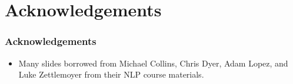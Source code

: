 
\section*{Acknowledgements}

\begin{frame}
\frametitle{Acknowledgements}
\begin{itemize}
\item Many slides borrowed from Michael Collins, Chris Dyer, Adam Lopez, and Luke Zettlemoyer from their NLP course materials.
\end{itemize}
\end{frame}

